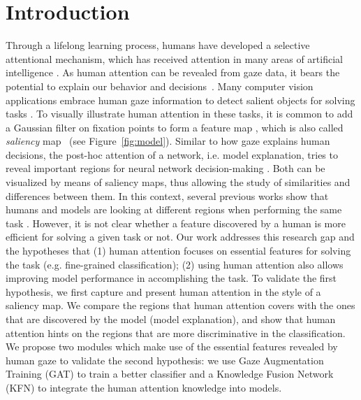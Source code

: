 \documentclass{bmvc2k}
\begin{document}
\section{Introduction}
Through a lifelong learning process, humans have developed a selective attentional mechanism, which has received attention in many areas of artificial intelligence \cite{zhang2020human}. As human attention can be revealed from gaze data, it bears the potential to explain our behavior and decisions~\cite{posner1990attention}. Many computer vision applications embrace human gaze information to detect salient objects for solving tasks \cite{shanmuga2015eye,santella2006gaze,Karessli_2017_CVPR}. To visually illustrate human attention in these tasks, it is common to add a Gaussian filter on fixation points to form a feature map \cite{Judd_2012}, which is also called \textit{saliency} map \cite{kummerer2016deepgaze}~(see Figure~\ref{fig:model}). 
Similar to how gaze explains human decisions, the post-hoc attention of a network, i.e. model explanation, tries to reveal important regions for neural network decision-making \cite{18_rise,19_cam,20_grad_cam,IG,shrikumar2016not,hooker2018benchmark}. Both can be visualized by means of saliency maps, thus allowing the study of similarities and differences between them. In this context, several previous works show that humans and models are looking at different regions when performing the same task \cite{das2017human,sen2020human}. However, it is not clear whether a feature discovered by a human is more efficient for solving a given task or not. Our work addresses this research gap and the hypotheses that (1) human attention focuses on essential features for solving the task (e.g. fine-grained classification); (2) using human attention also allows improving model performance in accomplishing the task. To validate the first hypothesis, we first capture and present human attention in the style of a saliency map. We compare the regions that human attention covers with the ones that are discovered by the model (model explanation), and show that human attention hints on the regions that are more discriminative in the classification. We propose two modules which make use of the essential features revealed by human gaze to validate the second hypothesis: we use Gaze Augmentation Training (GAT) to train a better classifier and a Knowledge Fusion Network (KFN) to integrate the human attention knowledge into models.
\end{document}

